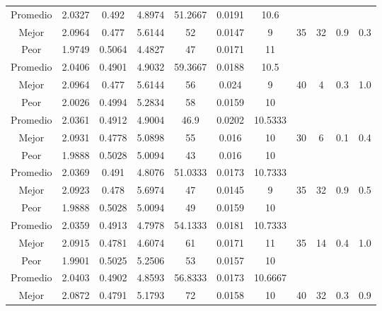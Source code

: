 \begin{table}[h!]
\begin{center}
\begin{tabular}{|c|c|c|c|c|c|c|c|c|c|c|}
        \hline
        \hline
            Promedio  & 2.0327 & 0.492 & 4.8974 & 51.2667 & 0.0191 & 10.6 &  &  &  & \\
            \cline{1-7}
            Mejor & 2.0964 & 0.477  & 5.6144 & 52 & 0.0147 & 9 & 35 & 32 & 0.9 & 0.3\\
            \cline{1-7}
            Peor & 1.9749 & 0.5064  & 4.4827 & 47 & 0.0171 & 11 &  &  &  & \\
        \hline
        \hline
            Promedio  & 2.0406 & 0.4901 & 4.9032 & 59.3667 & 0.0188 & 10.5 &  &  &  & \\
            \cline{1-7}
            Mejor & 2.0964 & 0.477  & 5.6144 & 56 & 0.024 & 9 & 40 & 4 & 0.3 & 1.0\\
            \cline{1-7}
            Peor & 2.0026 & 0.4994  & 5.2834 & 58 & 0.0159 & 10 &  &  &  & \\
        \hline
        \hline
            Promedio  & 2.0361 & 0.4912 & 4.9004 & 46.9 & 0.0202 & 10.5333 &  &  &  & \\
            \cline{1-7}
            Mejor & 2.0931 & 0.4778  & 5.0898 & 55 & 0.016 & 10 & 30 & 6 & 0.1 & 0.4\\
            \cline{1-7}
            Peor & 1.9888 & 0.5028  & 5.0094 & 43 & 0.016 & 10 &  &  &  & \\
        \hline
        \hline
            Promedio  & 2.0369 & 0.491 & 4.8076 & 51.0333 & 0.0173 & 10.7333 &  &  &  & \\
            \cline{1-7}
            Mejor & 2.0923 & 0.478  & 5.6974 & 47 & 0.0145 & 9 & 35 & 32 & 0.9 & 0.5\\
            \cline{1-7}
            Peor & 1.9888 & 0.5028  & 5.0094 & 49 & 0.0159 & 10 &  &  &  & \\
        \hline
        \hline
            Promedio  & 2.0359 & 0.4913 & 4.7978 & 54.1333 & 0.0181 & 10.7333 &  &  &  & \\
            \cline{1-7}
            Mejor & 2.0915 & 0.4781  & 4.6074 & 61 & 0.0171 & 11 & 35 & 14 & 0.4 & 1.0\\
            \cline{1-7}
            Peor & 1.9901 & 0.5025  & 5.2506 & 53 & 0.0157 & 10 &  &  &  & \\
        \hline
        \hline
            Promedio  & 2.0403 & 0.4902 & 4.8593 & 56.8333 & 0.0173 & 10.6667 &  &  &  & \\
            \cline{1-7}
            Mejor & 2.0872 & 0.4791  & 5.1793 & 72 & 0.0158 & 10 & 40 & 32 & 0.3 & 0.9\\
            \cline{1-7}

\end{tabular}
\end{center}
\end{table}
